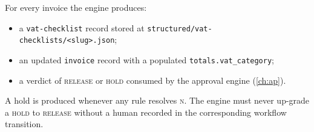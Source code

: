 For every invoice the engine produces:
\begin{itemize}
  \item a \texttt{vat-checklist} record stored at
        \texttt{structured/vat-checklists/<slug>.json};
  \item an updated \texttt{invoice} record with a populated
        \texttt{totals.vat\_category};
  \item a verdict of \textsc{release} or \textsc{hold} consumed by the
        approval engine (\cref{ch:ap}).
\end{itemize}

A hold is produced whenever any rule resolves \textsc{n}. The engine
must never up-grade a \textsc{hold} to \textsc{release} without a human
recorded in the corresponding workflow transition.
